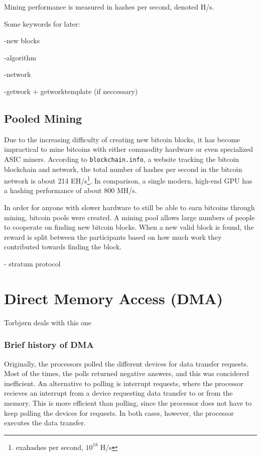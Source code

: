 Mining performance is measured in hashes per second, denoted H/s.

Some keywords for later:

-new blocks

-algorithm

-network

-getwork + getworktemplate (if neccessary)

\subsection{Pooled Mining}
Due to the increasing difficulty of creating new bitcoin blocks, it has become impractical
to mine bitcoins with either commodity hardware or even specialized ASIC miners. According
to \texttt{blockchain.info}, a website tracking the bitcoin blockchain and network, the
total number of hashes per second in the bitcoin network is about 214 EH/s\footnote{exahashes per second, $10^18$ H/s}.
In comparison, a single modern, high-end GPU has a hashing performance of about 800 MH/s.

In order for anyone with slower hardware to still be able to earn bitcoins through mining,
bitcoin pools were created. A mining pool allows large numbers of people to cooperate on
finding new bitcoin blocks. When a new valid block is found, the reward is split between
the participants based on how much work they contributed towards finding the block.

- stratum protocol

\section{Direct Memory Access (DMA)}

Torbjørn deals with this one

\subsubsection{Brief history of DMA}

Originally, the processors polled the different devices for data transfer requests. Most of the times, the polls returned negative answers, and this was concidered inefficient. An alternative to polling is interrupt requests, where the processor recieves an interrupt from a device requesting data transfer to or from the memory. This is more efficient than polling, since the processor does not have to keep polling the devices for requests. In both cases, however, the processor executes the data transfer.

